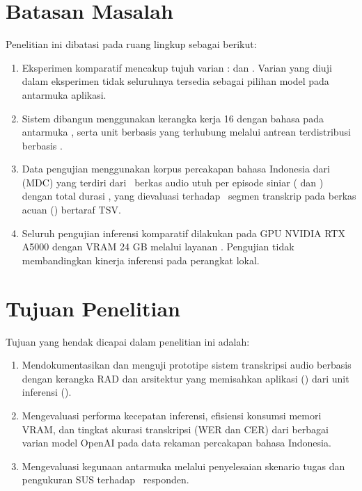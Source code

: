 \section{Batasan Masalah}
Penelitian ini dibatasi pada ruang lingkup sebagai berikut:
\begin{enumerate}
    \item Eksperimen komparatif mencakup tujuh varian :  dan . Varian yang diuji dalam eksperimen tidak seluruhnya tersedia sebagai pilihan model pada antarmuka aplikasi.
    \item Sistem dibangun menggunakan kerangka kerja  16 dengan bahasa  pada antarmuka , serta unit  berbasis  yang terhubung melalui antrean terdistribusi berbasis .
    \item Data pengujian menggunakan korpus percakapan bahasa Indonesia dari  (MDC) yang terdiri dari \totalberkasaudio\ berkas audio utuh per episode siniar ( dan ) dengan total durasi \totaldurasiaudio, yang dievaluasi terhadap \totalsegmentranskrip\ segmen transkrip pada berkas acuan () bertaraf TSV.
    \item Seluruh pengujian inferensi komparatif dilakukan pada GPU NVIDIA RTX A5000 dengan VRAM 24 GB melalui layanan . Pengujian tidak membandingkan kinerja inferensi pada perangkat lokal.
\end{enumerate}

\section{Tujuan Penelitian}
Tujuan yang hendak dicapai dalam penelitian ini adalah:
\begin{enumerate}
    \item Mendokumentasikan dan menguji prototipe sistem transkripsi audio berbasis  \namasistem dengan kerangka RAD dan arsitektur yang memisahkan aplikasi () dari unit inferensi ().
    \item Mengevaluasi performa kecepatan inferensi, efisiensi konsumsi memori VRAM, dan tingkat akurasi transkripsi (WER dan CER) dari berbagai varian model OpenAI  pada data rekaman percakapan bahasa Indonesia.
    \item Mengevaluasi kegunaan antarmuka melalui penyelesaian skenario tugas dan pengukuran SUS terhadap \jumlahresponden\ responden.
\end{enumerate}

